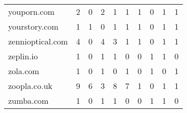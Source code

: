\begin{tabular}{lrrrrrrrrr}
                youporn.com &                                2 &                                  0 &                                      2 &                            1 &                           1 &                                   1 &                                      0 &                             1 &                            1 \\
              yourstory.com &                                1 &                                  1 &                                      0 &                            1 &                           1 &                                   1 &                                      0 &                             1 &                            1 \\
           zennioptical.com &                                4 &                                  0 &                                      4 &                            3 &                           1 &                                   1 &                                      0 &                             1 &                            1 \\
                  zeplin.io &                                1 &                                  0 &                                      1 &                            1 &                           0 &                                   0 &                                      1 &                             1 &                            0 \\
                   zola.com &                                1 &                                  0 &                                      1 &                            0 &                           1 &                                   0 &                                      1 &                             0 &                            1 \\
               zoopla.co.uk &                                9 &                                  6 &                                      3 &                            8 &                           7 &                                   1 &                                      0 &                             1 &                            1 \\
                  zumba.com &                                1 &                                  0 &                                      1 &                            1 &                           0 &                                   0 &                                      1 &                             1 &                            0 \\
\bottomrule
\end{tabular}

